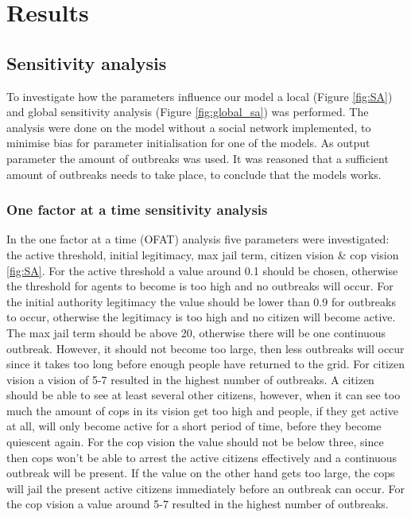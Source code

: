 \documentclass[10pt]{article}
\begin{document}
    \section{Results}

    \subsection{Sensitivity analysis}
    To investigate how the parameters influence our model a local (Figure \ref{fig:SA}) and global sensitivity analysis (Figure \ref{fig:global_sa}) was performed. The analysis were done on the model without a social network implemented, to minimise bias for parameter initialisation for one of the models. As output parameter the amount of outbreaks was used. It was reasoned that a sufficient amount of outbreaks needs to take place, to conclude that the models works.

    \subsubsection{One factor at a time sensitivity analysis}
    In the one factor at a time (OFAT) analysis five parameters were investigated: the active threshold, initial legitimacy, max jail term, citizen vision \& cop vision \ref{fig:SA}. For the active threshold a value around 0.1 should be chosen, otherwise the threshold for agents to become is too high and no outbreaks will occur. For the initial authority legitimacy the value should be lower than 0.9 for outbreaks to occur, otherwise the legitimacy is too high and no citizen will become active. The max jail term should be above 20, otherwise there will be one continuous outbreak. However, it should not become too large, then less outbreaks will occur since it takes too long before enough people have returned to the grid. For citizen vision a vision of 5-7 resulted in the highest number of outbreaks. A citizen should be able to see at least several other citizens, however, when it can see too much the amount of cops in its vision get too high and people, if they get active at all, will only become active for a short period of time, before they become quiescent again. For the cop vision the value should not be below three, since then cops won't be able to arrest the active citizens effectively and a continuous outbreak will be present. If the value on the other hand gets too large, the cops will jail the present active citizens immediately before an outbreak can occur. For the cop vision a value around 5-7 resulted in the highest number of outbreaks.
\end{document}
